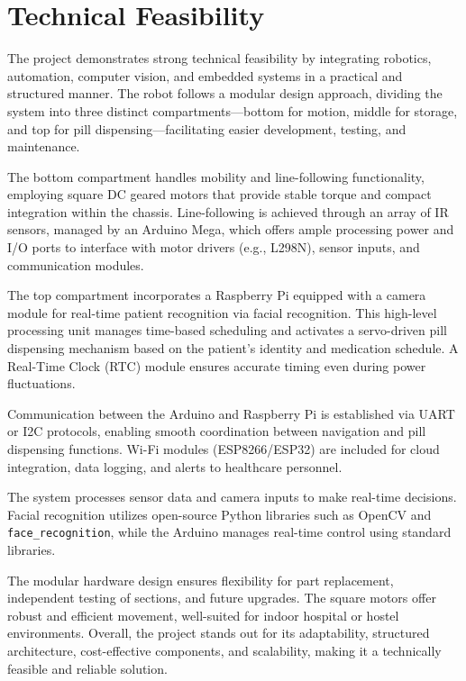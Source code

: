 \section{Technical Feasibility}

The project demonstrates strong technical feasibility by integrating robotics, automation, computer vision, and embedded systems in a practical and structured manner. The robot follows a modular design approach, dividing the system into three distinct compartments—bottom for motion, middle for storage, and top for pill dispensing—facilitating easier development, testing, and maintenance.

The bottom compartment handles mobility and line-following functionality, employing square DC geared motors that provide stable torque and compact integration within the chassis. Line-following is achieved through an array of IR sensors, managed by an Arduino Mega, which offers ample processing power and I/O ports to interface with motor drivers (e.g., L298N), sensor inputs, and communication modules.

The top compartment incorporates a Raspberry Pi equipped with a camera module for real-time patient recognition via facial recognition. This high-level processing unit manages time-based scheduling and activates a servo-driven pill dispensing mechanism based on the patient’s identity and medication schedule. A Real-Time Clock (RTC) module ensures accurate timing even during power fluctuations.

Communication between the Arduino and Raspberry Pi is established via UART or I2C protocols, enabling smooth coordination between navigation and pill dispensing functions. Wi-Fi modules (ESP8266/ESP32) are included for cloud integration, data logging, and alerts to healthcare personnel.

The system processes sensor data and camera inputs to make real-time decisions. Facial recognition utilizes open-source Python libraries such as OpenCV and \texttt{face\_recognition}, while the Arduino manages real-time control using standard libraries.

The modular hardware design ensures flexibility for part replacement, independent testing of sections, and future upgrades. The square motors offer robust and efficient movement, well-suited for indoor hospital or hostel environments. Overall, the project stands out for its adaptability, structured architecture, cost-effective components, and scalability, making it a technically feasible and reliable solution.

